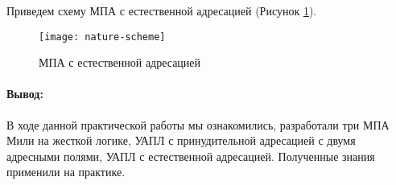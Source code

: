 \documentclass[a4paper,14pt]{extarticle}
\begin{document}
Приведем схему МПА с естественной адресацией (Рисунок \ref{fig:nature-scheme}).
\begin{figure}[htpb]
	\centering
	\texttt{[image: nature-scheme]}
	\caption{МПА с естественной адресацией}
	\label{fig:nature-scheme}
\end{figure}
	\paragraph{Вывод:}
	В ходе данной практической работы мы ознакомились, разработали три МПА Мили на жесткой логике, УАПЛ с принудительной адресацией с двумя адресными полями, УАПЛ с естественной адресацией.
	Полученные знания применили на практике.
	
	
\end{document}

